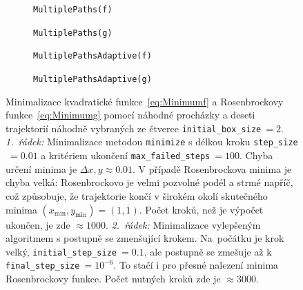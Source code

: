 \documentclass[a4paper,11pt,twoside]{article}
\def\code#1{\textnormal{\texttt{#1}}}
\theoremstyle{red}
\theoremstyle{green}
\begin{document}
\begin{solution}
    \begin{figure}[!htb]
        \centering
        \begin{subfigure}{0.49\linewidth}
            \centering{}
            \caption{\code{MultiplePaths(f)}}
        \end{subfigure}
        \hfill
        \begin{subfigure}{0.49\linewidth}
            \centering{}
            \caption{\code{MultiplePaths(g)}}
        \end{subfigure}
        \begin{subfigure}{0.49\linewidth}
            \centering{}
            \caption{\code{MultiplePathsAdaptive(f)}}
        \end{subfigure}
        \hfill
        \begin{subfigure}{0.49\linewidth}
            \centering{}
            \caption{\code{MultiplePathsAdaptive(g)}}
        \end{subfigure}

        \caption{
            \protect\small
            Minimalizace kvadratické funkce~\eqref{eq:Minimumf} a Rosenbrockovy funkce~\eqref{eq:Minimumg} pomocí náhodné procházky a deseti trajektorií náhodně vybraných ze čtverce \code{initial_box_size}$\ =2$.
            \emph{1.~řádek:} Minimalizace metodou \code{minimize} s délkou kroku \code{step_size}$\ =0.01$ a kritériem ukončení \code{max_failed_steps}$\ =100$.
            Chyba určení minima je $\Delta x,y\approx0.01$. 
            V případě Rosenbrockova minima je chyba velká: Rosenbrockovo  je velmi pozvolné podél a strmé napříč, což způsobuje, že trajektorie končí v širokém okolí skutečného minima $(x_{\mathrm{min}},y_{\mathrm{min}})=(1,1)$.
            Počet kroků, než je výpočet ukončen, je zde $\approx1000$.
            \emph{2.~řádek:} Minimalizace vylepšeným algoritmem s postupně se zmenšující krokem.
            Na~počátku je krok velký, \code{initial_step_size}$\ =0.1$, ale postupně se zmešuje až k \code{final_step_size}$\ =10^{-6}$.
            To stačí i pro přesné nalezení minima Rosenbrockovy funkce.
            Počet nutných kroků zde je $\approx3000$.
        }	
        \label{fig:Minimalizacefg}
    \end{figure}


\end{solution}
\end{document}
